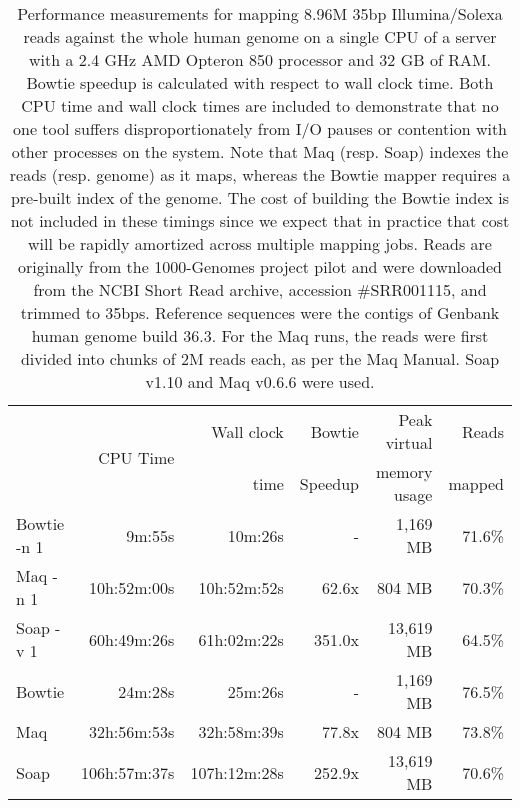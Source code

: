 \documentclass[letterpaper]{article}
\begin{document}
\begin{table}[tp]
\scriptsize
\begin{tabular}{lrrrrr}
\toprule
 & \multirow{2}{*}{CPU Time} & Wall clock & Bowtie  & Peak virtual & Reads  \\
 &                            & time       & Speedup & memory usage & mapped \\[3pt]
\toprule
Bowtie -n 1 & 9m:55s & 10m:26s & - & 1,169 MB & 71.6\%\\\midrule
Maq -n 1 & 10h:52m:00s & 10h:52m:52s & 62.6x & 804 MB & 70.3\%\\\midrule
Soap -v 1 & 60h:49m:26s & 61h:02m:22s & 351.0x & 13,619 MB & 64.5\%\\\midrule
\midrule
Bowtie & 24m:28s & 25m:26s & - & 1,169 MB & 76.5\%\\\midrule
Maq & 32h:56m:53s & 32h:58m:39s & 77.8x & 804 MB & 73.8\%\\\midrule
Soap & 106h:57m:37s & 107h:12m:28s & 252.9x & 13,619 MB & 70.6\%\\
\bottomrule
\end{tabular}
\caption{Performance measurements for mapping 8.96M 35bp Illumina/Solexa reads against the whole human genome on a single CPU of a server with a 2.4 GHz AMD Opteron 850 processor and 32 GB of RAM. Bowtie speedup is calculated with respect to wall clock time. Both CPU time and wall clock times are included to demonstrate that no one tool suffers disproportionately from I/O pauses or contention with other processes on the system. Note that Maq (resp. Soap) indexes the reads (resp. genome) as it maps, whereas the Bowtie mapper requires a pre-built index of the genome.  The cost of building the Bowtie index is not included in these timings since we expect that in practice that cost will be rapidly amortized across multiple mapping jobs. Reads are originally from the 1000-Genomes project pilot and were downloaded from the NCBI Short Read archive, accession \#SRR001115, and trimmed to 35bps. Reference sequences were the contigs of Genbank human genome build 36.3. For the Maq runs, the reads were first divided into chunks of 2M reads each, as per the Maq Manual. Soap v1.10 and Maq v0.6.6 were used. }
\end{table}
\end{document}
